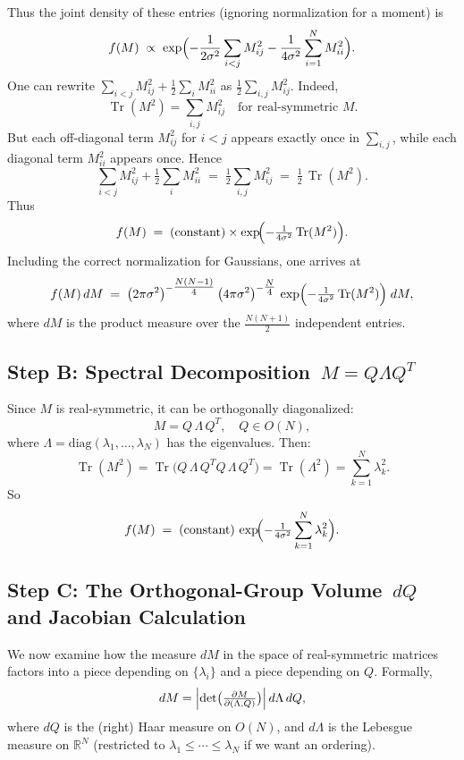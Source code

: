 \documentclass[letterpaper,11pt,oneside,reqno]{article}
\numberwithin{equation}{section}
\theoremstyle{definition}
\begin{document}
Thus the joint density of these entries (ignoring normalization for a moment) is
\[
  f(M) \;\propto\;
  \exp\Bigl(
    -\frac{1}{2\sigma^2} \sum_{i<j} M_{ij}^2
    -\frac{1}{4\sigma^2} \sum_{i=1}^N M_{ii}^2
  \Bigr).
\]
One can rewrite \(\sum_{i<j}M_{ij}^2 + \tfrac12\sum_i M_{ii}^2\) as \(\tfrac12 \sum_{i,j} M_{ij}^2\). Indeed,
\[
  \operatorname{Tr}(M^2) = \sum_{i,j} M_{ij}^2
  \quad \text{for real-symmetric } M.
\]
But each off-diagonal term \(M_{ij}^2\) for \(i<j\) appears exactly once in \(\sum_{i,j}\), while each diagonal term \(M_{ii}^2\) appears once. Hence
\[
  \sum_{i<j}M_{ij}^2 + \tfrac12\sum_i M_{ii}^2
  \;=\;
  \tfrac12 \sum_{i,j} M_{ij}^2
  \;=\; \tfrac12\,\operatorname{Tr}(M^2).
\]
Thus
\[
  f(M)
  \;=\; \text{(constant)} \times
  \exp\!\Bigl(-\tfrac{1}{4\sigma^2}\operatorname{Tr}(M^2)\Bigr).
\]
Including the correct normalization for Gaussians, one arrives at
\[
  f(M)\,dM
  \;=\;
  \bigl(2\pi\sigma^2\bigr)^{-\tfrac{N(N-1)}{4}}
  \,\bigl(4\pi\sigma^2\bigr)^{-\tfrac{N}{4}}
  \,\exp\Bigl(-\tfrac{1}{4\sigma^2}\operatorname{Tr}(M^2)\Bigr)\; dM,
\]
where \(dM\) is the product measure over the \(\tfrac{N(N+1)}{2}\) independent entries.

\subsection{Step B: Spectral Decomposition \(\,M=Q\Lambda Q^T\)}
\label{subsec:spectral}

Since \(M\) is real-symmetric, it can be orthogonally diagonalized:
\[
  M = Q\,\Lambda\,Q^T,\quad
  Q \in O(N),
\]
where \(\Lambda = \mathrm{diag}(\lambda_1,\ldots,\lambda_N)\) has the eigenvalues.  Then:
\[
  \operatorname{Tr}(M^2)
  = \operatorname{Tr}\bigl(Q\,\Lambda\,Q^T Q\,\Lambda\,Q^T\bigr)
  = \operatorname{Tr}(\Lambda^2)
  = \sum_{k=1}^N \lambda_k^2.
\]
So
\[
  f(M)
  \;=\;\text{(constant)}\,\exp\!\Bigl(
    -\tfrac{1}{4\sigma^2}\sum_{k=1}^N \lambda_k^2
  \Bigr).
\]

\subsection{Step C: The Orthogonal-Group Volume \(\,dQ\) and Jacobian Calculation}
\label{subsec:jacobian}

We now examine how the measure \(dM\) in the space of real-symmetric matrices factors into a piece depending on \(\{\lambda_i\}\) and a piece depending on \(Q\).  Formally,
\[
  dM
  = \Bigl|\det\bigl(\tfrac{\partial M}{\partial(\Lambda,Q)}\bigr)\Bigr|
    \,d\Lambda\,dQ,
\]
where \(dQ\) is the (right) Haar measure on \(O(N)\), and \(d\Lambda\) is the Lebesgue measure on \(\mathbb{R}^N\) (restricted to \(\lambda_1\le \cdots\le \lambda_N\) if we want an ordering).
\end{document}
